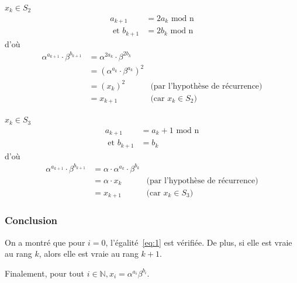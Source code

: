         \underline{$x_{k} \in S_2$}
        \begin{align*}
          a_{k+1} &= 2a_k \text{\ mod n}\\
          \text{\ et } b_{k+1} &= 2b_k \text{\ mod n}
        \end{align*}
        d'où
        \begin{align*}
          \alpha^{a_{k+1}} \cdot \beta^{b_{k+1}} &= \alpha^{2a_k} \cdot \beta^{2b_k} \\
                                                 &= {(\alpha^{a_k} \cdot \beta^{a_k})}^2 \\
                                                 &= {(x_k)}^2 & \text{(par l'hypothèse de récurrence)} \\
                                                 &= x_{k+1} & \text{(car $x_k \in S_2$)}
        \end{align*}

        \underline{$x_{k} \in S_3$}
        \begin{align*}
          a_{k+1} &= a_k + 1 \text{\ mod n} \\
          \text{\ et } b_{k+1} &= b_k
        \end{align*}
        d'où
        \begin{align*}
          \alpha^{a_{k+1}} \cdot \beta^{b_{k+1}} &= \alpha \cdot \alpha^{a_k} \cdot \beta^{b_k} \\
                                                 &= \alpha \cdot x_k & \text{(par l'hypothèse de récurrence)} \\
                                                 &= x_{k+1} & \text{(car $x_k \in S_3$)}
        \end{align*}


        \subsubsection{Conclusion}
        On a montré que pour $i = 0$, l'égalité~\ref{eq:1} est vérifiée.
        De plus, si elle est vraie au rang $k$, alors elle est vraie au rang $k+1$.

        Finalement, pour tout $i \in \mathbb{N}, x_i = \alpha^{a_i} \beta^{b_i}$.


